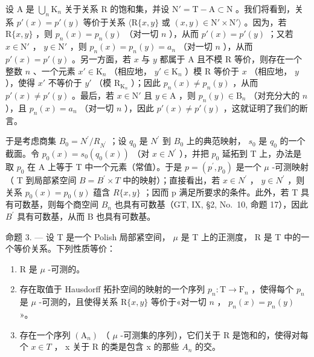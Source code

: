 设 A 是 \(\bigcup_{n} \mathrm{K}_{n}\) 关于关系 R 的饱和集，并设 \(\mathrm{N}' = \mathrm{T} - \mathrm{A} \subset \mathrm{N}\) 。我们将看到，关系 \(p'(x) = p'(y)\) 等价于关系 \(\langle \mathrm{R}\{x, y\}\) 或 \((x, y) \in \mathrm{N}' \times \mathrm{N}' \rangle\) 。因为，若 \(\mathrm{R}\{x, y\}\) ，则 \(p_n(x) = p_n(y)\) （对一切 \(n\) ），从而 \(p'(x) = p'(y)\) ；又若 \(x \in \mathrm{N}'\) ， \(y \in \mathrm{N}'\) ，则 \(p_n(x) = p_n(y) = a_n\) （对一切 \(n\) ），从而 \(p'(x) = p'(y)\) 。另一方面，若 \(x\) 与 \(y\) 都属于 A 且不模 R 等价，则存在一个整数 \(n\) 、一个元素 \(x' \in \mathrm{K}_n\) （相应地， \(y' \in \mathrm{K}_n\) ）模 R 等价于 \(x\) （相应地， \(y\) ），使得 \(x'\) 不等价于 \(y'\) （模 \(\mathrm{R}_{\mathrm{K}_n}\) ）；因此 \(p_n(x) \neq p_n(y)\) ，从而 \(p'(x) \neq p'(y)\) 。最后，若 \(x \in \mathrm{N}'\) 且 \(y \in \mathrm{A}\) ，则 \(p_n(y) \in \mathrm{B}_n\) （对充分大的 \(n\) ），且 \(p_n(x) = a_n\) （对一切 \(n\) ），因此 \(p'(x) \neq p'(y)\) ，这就证明了我们的断言。

于是考虑商集 \(B_{0} = N^{\prime}/R_{N^{\prime}}\) ；设 \(q_{0}\) 是 \(N^{\prime}\) 到 \(B_{0}\) 上的典范映射， \(s_{0}\) 是 \(q_{0}\) 的一个截面。令 \(p_{0}(x) = s_{0}(q_{0}(x))\) （对 \(x \in N^{\prime}\) ），并把 \(p_{0}\) 延拓到 T 上，办法是取 \(p_{0}\) 在 A 上等于 T 中一个元素（常值）。于是 \(p = (p^{\prime}, p_{0})\) 是一个 \(\mu\) -可测映射（ T 到局部紧空间 \(B = B^{\prime} \times T\) 中的映射）；直接看出，若 \(x \in N^{\prime}\) ， \(y \in N^{\prime}\) ，则关系 \(p_{0}(x) = p_{0}(y)\) 蕴含 \(R\{x, y\}\) ；因而 p 满足所要求的条件。此外，若 T 具有可数基，则每个商空间 \(B_{n}\) 也具有可数基（GT, IX, §2, No.~10, 命题 17），因此 \(B^{\prime}\) 具有可数基，从而 B 也具有可数基。

命题 3. --- 设 T 是一个 Polish 局部紧空间， \(\mu\) 是 T 上的正测度， R 是 T 中的一个等价关系。下列性质等价：

\begin{enumerate}
\def\labelenumi{\alph{enumi})}
\item
  R 是 \(\mu\) -可测的。
\item
  存在取值于 Hausdorff 拓扑空间的映射的一个序列 \(p_n: \mathrm{T} \to \mathrm{F}_n\) ，使得每个 \(p_n\) 是 \(\mu\) -可测的，且使得关系 \(\mathrm{R}\{x, y\}\) 等价于«对一切 \(n\) ， \(p_n(x) = p_n(y)\) »。
\item
  存在一个序列 \((\mathrm{A}_{n})\) （ \(\mu\) -可测集的序列），它们关于 R 是饱和的，使得对每个 \(x \in T\) ， x 关于 R 的类是包含 x 的那些 \(A_{n}\) 的交。
\end{enumerate}

